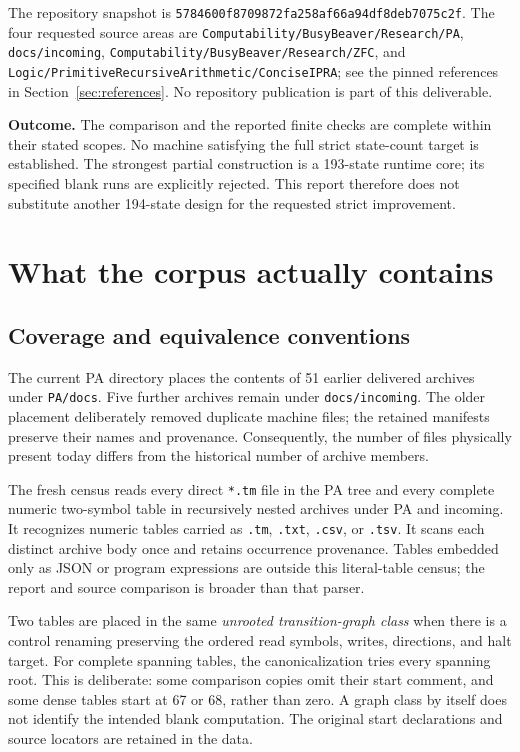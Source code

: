 \documentclass[11pt,letterpaper]{article}
\newcommand{\file}[1]{\texttt{\nolinkurl{#1}}}
\newcommand{\snap}{\texttt{5784600f8709872fa258af66a94df8deb7075c2f}}
\begin{document}
The repository snapshot is \snap. The four requested source areas are
\file{Computability/BusyBeaver/Research/PA}, \file{docs/incoming},
\file{Computability/BusyBeaver/Research/ZFC}, and
\file{Logic/PrimitiveRecursiveArithmetic/ConciseIPRA}; see the pinned
references in Section~\ref{sec:references}. No repository publication is part
of this deliverable.

\textbf{Outcome.} The comparison and the reported finite checks are complete
within their stated scopes. No machine satisfying the full strict state-count
target is established. The strongest partial construction is a 193-state
runtime core; its specified blank runs are explicitly rejected. This report
therefore does not substitute another 194-state design for the requested
strict improvement.

\section{What the corpus actually contains}
\label{sec:corpus}

\subsection{Coverage and equivalence conventions}

The current PA directory places the contents of 51 earlier delivered
archives under \file{PA/docs}. Five further archives remain under
\file{docs/incoming}. The older placement deliberately removed duplicate
machine files; the retained manifests preserve their names and provenance.
Consequently, the number of files physically present today differs from the
historical number of archive members.

The fresh census reads every direct \file{*.tm} file in the PA tree and every
complete numeric two-symbol table in recursively nested archives under PA
and incoming. It recognizes numeric tables carried as \file{.tm},
\file{.txt}, \file{.csv}, or \file{.tsv}. It scans each distinct archive body
once and retains occurrence provenance. Tables embedded only as JSON or
program expressions are outside this literal-table census; the report and
source comparison is broader than that parser.

Two tables are placed in the same \emph{unrooted transition-graph class}
when there is a control renaming preserving the ordered read symbols,
writes, directions, and halt target. For complete spanning tables, the
canonicalization tries every spanning root. This is deliberate: some comparison copies omit their start
comment, and some dense tables start at 67 or 68, rather than zero. A graph
class by itself does not identify the intended blank computation. The
original start declarations and source locators are retained in the data.
\end{document}
